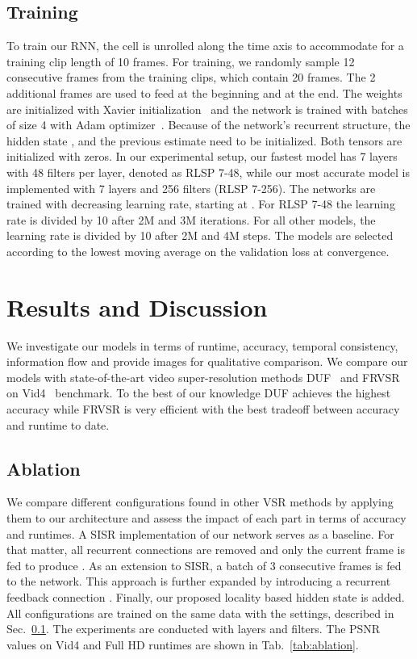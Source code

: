 \documentclass[10pt,twocolumn,letterpaper]{article}
\begin{document}
\subsection{Training}
\label{sec:training}
To train our RNN, the cell is unrolled along the time axis to accommodate for a training clip length of 10 frames. For training, we randomly sample 12 consecutive frames from the training clips, which contain 20 frames. The 2 additional frames are used to feed  at the beginning and  at the end. The weights are initialized with Xavier initialization~\cite{xavier} and the network is trained with batches of size 4 with Adam optimizer~\cite{adam}. Because of the network's recurrent structure, the hidden state , and the previous estimate  need to be initialized. Both tensors are initialized with zeros. In our experimental setup, our fastest model has 7 layers with 48 filters per layer, denoted as RLSP 7-48, while our most accurate model is implemented with 7 layers and 256 filters (RLSP 7-256). 
The networks are trained with decreasing learning rate, starting at . For RLSP 7-48 the learning rate is divided by 10 after 2M and 3M iterations. For all other models, the learning rate is divided by 10 after 2M and 4M steps. The models are selected according to the lowest moving average on the validation loss at convergence.



\section{Results and Discussion}

We investigate our models in terms of runtime, accuracy, temporal consistency, information flow and provide images for qualitative comparison. We compare our models with state-of-the-art video super-resolution methods DUF~\cite{duf} and FRVSR~\cite{frvsr} on Vid4~\cite{bayes} benchmark. To the best of our knowledge DUF achieves the highest accuracy while FRVSR is very efficient with the best tradeoff between accuracy and runtime to date.


\subsection{Ablation}

We compare different configurations found in other VSR methods by applying them to our architecture and assess the impact of each part in terms of accuracy and runtimes. A SISR implementation of our network serves as a baseline. For that matter, all recurrent connections are removed and only the current frame  is fed to produce . As an extension to SISR, a batch of 3 consecutive frames  is fed to the network. This approach is further expanded by introducing a recurrent feedback connection . Finally, our proposed locality based hidden state is added. All configurations are trained on the same data with the settings, described in Sec.~\ref{sec:training}. The experiments are conducted with  layers and  filters. The PSNR values on Vid4 and Full HD runtimes are shown in Tab.~\ref{tab:ablation}.
\end{document}
